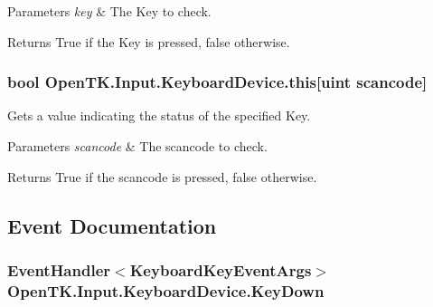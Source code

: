 \begin{DoxyParams}{Parameters}
{\em key} & The Key to check.\\
\hline
\end{DoxyParams}
\begin{DoxyReturn}{Returns}
True if the Key is pressed, false otherwise.
\end{DoxyReturn}
\hypertarget{class_open_t_k_1_1_input_1_1_keyboard_device_aa352ed059cb4a2b3127bf307bcdc72ce}{
\subsubsection[{this[uint scancode]}]{\setlength{\rightskip}{0pt plus 5cm}bool Open\-T\-K.\-Input.\-Keyboard\-Device.\-this\mbox{[}uint scancode\mbox{]}\hspace{0.3cm}{\ttfamily [get]}}}\label{class_open_t_k_1_1_input_1_1_keyboard_device_aa352ed059cb4a2b3127bf307bcdc72ce}


Gets a value indicating the status of the specified Key. 


\begin{DoxyParams}{Parameters}
{\em scancode} & The scancode to check.\\
\hline
\end{DoxyParams}
\begin{DoxyReturn}{Returns}
True if the scancode is pressed, false otherwise.
\end{DoxyReturn}


\subsection{Event Documentation}
\hypertarget{class_open_t_k_1_1_input_1_1_keyboard_device_a6149deb628a69ffafd9616ec88403827}{
\subsubsection[{Key\-Down}]{\setlength{\rightskip}{0pt plus 5cm}Event\-Handler$<${\bf Keyboard\-Key\-Event\-Args}$>$ Open\-T\-K.\-Input.\-Keyboard\-Device.\-Key\-Down}}\label{class_open_t_k_1_1_input_1_1_keyboard_device_a6149deb628a69ffafd9616ec88403827}


